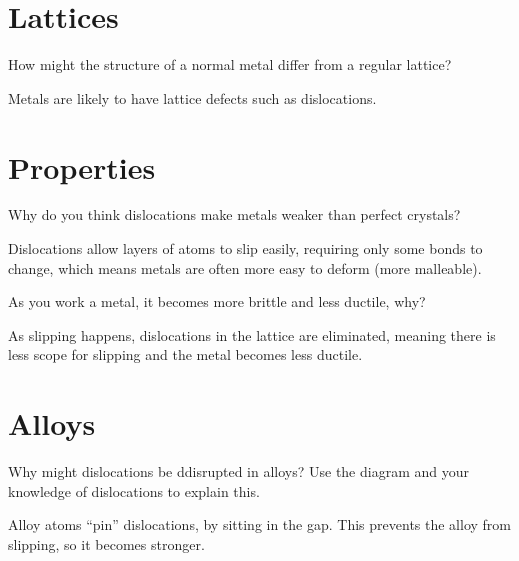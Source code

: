 \documentclass{exam}
\begin{document}
\printanswers
\section{Lattices}
\begin{questions}
\question How might the structure of a normal metal differ from a regular lattice?
\begin{solution}[.2in]
    Metals are likely to have lattice defects such as dislocations.
\end{solution}
\end{questions}
\section{Properties}
\begin{questions}
\question Why do you think dislocations make metals weaker than perfect crystals?
\begin{solution}[.2in]
    Dislocations allow layers of atoms to slip easily, requiring only some
    bonds to change, which means metals are often more easy to deform (more
    malleable).
\end{solution}
\question As you work a metal, it becomes more brittle and less ductile, why?
\begin{solution}[.2in]
    As slipping happens, dislocations in the lattice are eliminated, meaning
    there is less scope for slipping and the metal becomes less ductile.
\end{solution}
\end{questions}
\section{Alloys}
\begin{questions}
\question Why might dislocations be ddisrupted in alloys? Use the diagram and
          your knowledge of dislocations to explain this.
\begin{solution}[.2in]
    Alloy atoms ``pin'' dislocations, by sitting in the gap. This prevents the
    alloy from slipping, so it becomes stronger.
\end{solution}
\end{questions}
\end{document}
